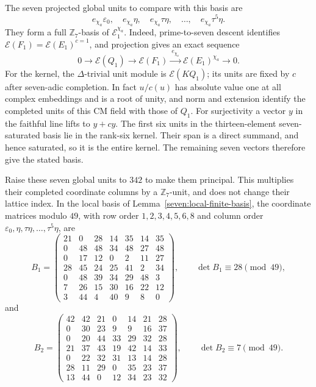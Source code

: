 \documentclass[11pt]{article}
\begin{document}
The seven projected global units to compare with this basis are
\[
 e_{\chi_a}\varepsilon_0,\quad
 e_{\chi_a}\eta,\quad e_{\chi_a}\tau\eta,\quad\ldots,\quad
 e_{\chi_a}\tau^5\eta.
\]
They form a full $\mathbb Z_7$-basis of $\mathcal E_1^{\chi_a}$.
Indeed, prime-to-seven descent identifies
$\mathcal E(F_1)=\mathcal E(E_1)^{c=1}$, and projection gives an exact
sequence
\[
 0\longrightarrow\mathcal E(Q_1)
 \longrightarrow\mathcal E(F_1)
 \xrightarrow{\ e_{\chi_a}\ }\mathcal E(E_1)^{\chi_a}
 \longrightarrow0.
\]
For the kernel, the $\Delta$-trivial unit module is
$\mathcal E(KQ_1)$; its units are fixed by $c$ after seven-adic
completion. In fact $u/c(u)$ has absolute value one at all complex
embeddings and is a root of unity, and norm and extension identify
the completed units of this CM field with those of $Q_1$.
For surjectivity a vector $y$ in the faithful line lifts to $y+cy$.
The first six units in the thirteen-element seven-saturated basis
lie in the rank-six kernel. Their span is a direct summand, and hence
saturated, so it is the entire kernel. The remaining seven vectors
therefore give the stated basis.

Raise these seven global units to $342$ to make them principal.
This multiplies their completed coordinate columns by a
$\mathbb Z_7$-unit, and does not change their lattice index.
In the local basis of Lemma~\ref{seven:local-finite-basis}, the
coordinate matrices modulo $49$, with row order
$1,2,3,4,5,6,8$ and column order
$\varepsilon_0,\eta,\tau\eta,\ldots,\tau^5\eta$, are
\begin{equation*}\tag{U12}\label{seven:local-matrix-one}
 B_1=
 \begin{pmatrix}
 21&0&28&14&35&14&35\\
 0&48&48&34&48&27&48\\
 0&17&12&0&2&11&27\\
 28&45&24&25&41&2&34\\
 0&48&39&34&29&48&3\\
 7&26&15&30&16&22&12\\
 3&44&4&40&9&8&0
 \end{pmatrix},
 \qquad\det B_1\equiv28\pmod{49},
\end{equation*}
and
\begin{equation*}\tag{U13}\label{seven:local-matrix-two}
 B_2=
 \begin{pmatrix}
 42&42&21&0&14&21&28\\
 0&30&23&9&9&16&37\\
 0&20&44&33&29&32&28\\
 21&37&43&19&42&14&33\\
 0&22&32&31&13&14&28\\
 28&11&29&0&35&23&37\\
 13&44&0&12&34&23&32
 \end{pmatrix},
 \qquad\det B_2\equiv7\pmod{49}.
\end{equation*}
\end{document}
